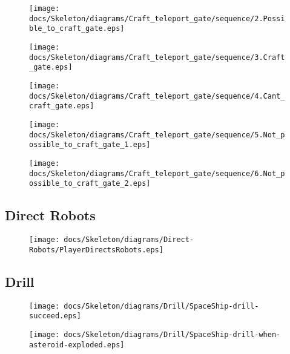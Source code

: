\begin{figure}[H] 
    \centering 
    \texttt{[image: docs/Skeleton/diagrams/Craft\_teleport\_gate/sequence/2.Possible\_to\_craft\_gate.eps]} 
    \caption{} 
\end{figure}

\begin{figure}[H] 
    \centering 
    \texttt{[image: docs/Skeleton/diagrams/Craft\_teleport\_gate/sequence/3.Craft\_gate.eps]} 
    \caption{} 
\end{figure}

\begin{figure}[H] 
    \centering 
    \texttt{[image: docs/Skeleton/diagrams/Craft\_teleport\_gate/sequence/4.Cant\_craft\_gate.eps]} 
    \caption{} 
\end{figure}

\begin{figure}[H] 
    \centering 
    \texttt{[image: docs/Skeleton/diagrams/Craft\_teleport\_gate/sequence/5.Not\_possible\_to\_craft\_gate\_1.eps]} 
    \caption{} 
\end{figure}

\begin{figure}[H] 
    \centering 
    \texttt{[image: docs/Skeleton/diagrams/Craft\_teleport\_gate/sequence/6.Not\_possible\_to\_craft\_gate\_2.eps]} 
    \caption{} 
\end{figure}

\subsection{Direct Robots}

\begin{figure}[H] 
    \centering 
    \texttt{[image: docs/Skeleton/diagrams/Direct-Robots/PlayerDirectsRobots.eps]} 
    \caption{} 
\end{figure}

\subsection{Drill}

\begin{figure}[H] 
    \centering 
    \texttt{[image: docs/Skeleton/diagrams/Drill/SpaceShip-drill-succeed.eps]} 
    \caption{} 
\end{figure} 

\begin{figure}[H] 
    \centering 
    \texttt{[image: docs/Skeleton/diagrams/Drill/SpaceShip-drill-when-asteroid-exploded.eps]} 
    \caption{} 
\end{figure} 

